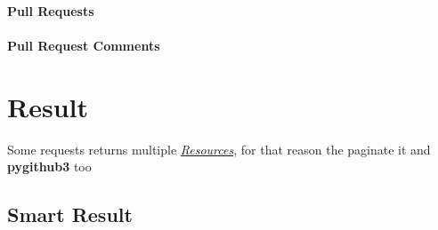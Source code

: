 \documentclass[letterpaper,10pt,english]{sphinxmanual}
\begin{document}
\paragraph{Pull Requests}
\label{pull_requests:pull-requests}

\paragraph{Pull Request Comments}
\label{pull_requests:pull-request-comments}\label{pull_requests:pull-request-comments-service}

\section{Result}
\label{result::doc}\label{result:id2}\label{result:github-pullrequests-comments-doc}\label{result:result}
Some requests returns multiple {\hyperref[resources::doc]{\emph{Resources}}}, for that reason the
 paginate it and \textbf{pygithub3} too


\subsection{Smart Result}
\label{result:smart-result}
\end{document}
